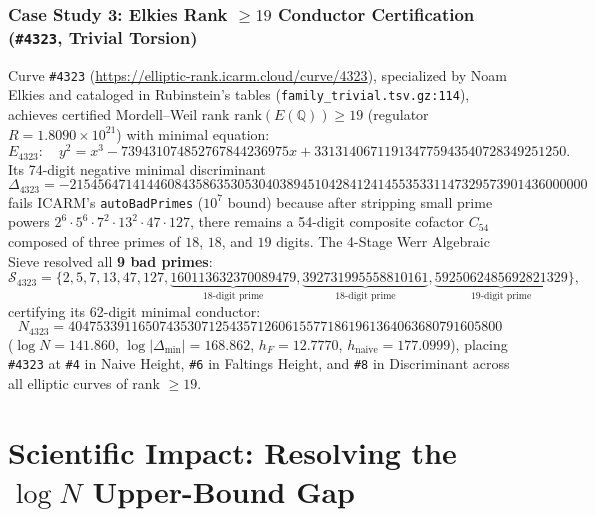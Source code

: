 \documentclass[10pt,a4paper]{article}
\theoremstyle{plain}
\theoremstyle{definition}
\theoremstyle{remark}
\begin{document}
\subsubsection{\texorpdfstring{Case Study 3: Elkies Rank $\ge 19$ Conductor Certification (\texttt{\#4323}, Trivial Torsion)}{Case Study 3: Elkies Rank >= 19 Conductor Certification (\#4323, Trivial Torsion)}}

Curve \texttt{\#4323} (\url{https://elliptic-rank.icarm.cloud/curve/4323}), specialized by Noam Elkies and cataloged in Rubinstein's tables (\texttt{family\_trivial.tsv.gz:114}), achieves certified Mordell--Weil rank $\mathrm{rank}(E(\mathbb{Q})) \ge 19$ (regulator $R = 1.8090 \times 10^{21}$) with minimal equation:
\begin{equation}
E_{4323}: \quad y^2 = x^3 - 739431074852767844236975 x + 331314067119134775943540728349251250.
\end{equation}
Its 74-digit negative minimal discriminant
\begin{equation*}
\Delta_{4323} = -21545647141446084358635305304038945104284124145535331147329573901436000000
\end{equation*}
fails ICARM's \texttt{autoBadPrimes} ($10^7$ bound) because after stripping small prime powers $2^6 \cdot 5^6 \cdot 7^2 \cdot 13^2 \cdot 47 \cdot 127$, there remains a 54-digit composite cofactor $C_{54}$ composed of three primes of $18$, $18$, and $19$ digits. The 4-Stage Werr Algebraic Sieve resolved all \textbf{9 bad primes}:
\begin{equation}
\mathcal{S}_{4323} = \{2, 5, 7, 13, 47, 127, \underbrace{160113632370089479}_{\text{18-digit prime}}, \underbrace{392731995558810161}_{\text{18-digit prime}}, \underbrace{5925062485692821329}_{\text{19-digit prime}}\},
\end{equation}
certifying its 62-digit minimal conductor:
\begin{equation*}
N_{4323} = 40475339116507435307125435712606155771861961364063680791605800
\end{equation*}
($\log N = 141.860$, $\log |\Delta_{\min}| = 168.862$, $h_F = 12.7770$, $h_{\text{naive}} = 177.0999$), placing \texttt{\#4323} at \texttt{\#4} in Naive Height, \texttt{\#6} in Faltings Height, and \texttt{\#8} in Discriminant across all elliptic curves of rank $\ge 19$.

\section{\texorpdfstring{Scientific Impact: Resolving the $\log N$ Upper-Bound Gap}{Scientific Impact: Resolving the log N Upper-Bound Gap}}
\end{document}
